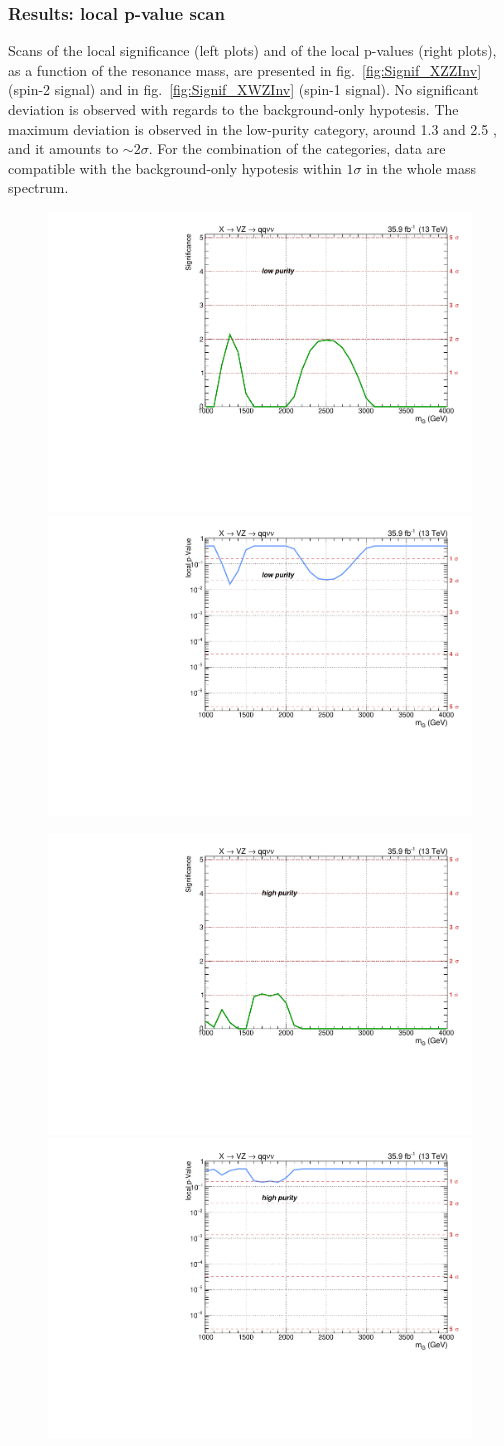\subsubsection{Results: local p-value scan}
Scans of the local significance (left plots) and of the local p-values (right plots), as a function of the resonance mass, are presented in fig.~\ref{fig:Signif_XZZInv} (spin-2 signal) and in fig.~\ref{fig:Signif_XWZInv} (spin-1 signal). No significant deviation is observed with regards to the background-only hypotesis. The maximum deviation is observed in the low-purity category, around 1.3 and 2.5 \TeV, and it amounts to $\sim 2 \sigma$. For the combination of the categories, data are compatible with the background-only hypotesis within $1 \sigma$ in the whole mass spectrum.

\begin{figure}[!htb]
  \begin{center}
     \includegraphics[width=.495\textwidth]{plotsAlpha_tesi/Limits/Significance_XZZInv_XVZnnlp.pdf}%
     \includegraphics[width=.495\textwidth]{plotsAlpha_tesi/Limits/pValue_XZZInv_XVZnnlp.pdf}

     \includegraphics[width=.495\textwidth]{plotsAlpha_tesi/Limits/Significance_XZZInv_XVZnnhp.pdf}%
     \includegraphics[width=.495\textwidth]{plotsAlpha_tesi/Limits/pValue_XZZInv_XVZnnhp.pdf}


\end{center}
\end{figure}
